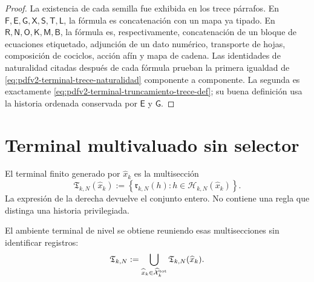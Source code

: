 \begin{proof}
La existencia de cada semilla fue exhibida en los trece párrafos. En
\(\mathsf F,\mathsf E,\mathsf G,\mathsf X,\mathsf S,\mathsf T,\mathsf L\),
la fórmula es concatenación con un mapa ya tipado. En
\(\mathsf R,\mathsf N,\mathsf O,\mathsf K,\mathsf M,\mathsf B\), la
fórmula es, respectivamente, concatenación de un bloque de ecuaciones
etiquetado, adjunción de un dato numérico, transporte de hojas, composición
de cociclos, acción afín y mapa de cadena. Las identidades de naturalidad
citadas después de cada fórmula prueban la primera igualdad de
\eqref{eq:pdfv2-terminal-trece-naturalidad} componente a componente. La
segunda es exactamente
\eqref{eq:pdfv2-terminal-truncamiento-trece-def}; su buena definición usa la
historia ordenada conservada por \(\mathsf E\) y \(\mathsf G\).
\end{proof}

\section{Terminal multivaluado sin selector}

El terminal finito generado por \(\widehat x_k\) es la multisecci\'on
\begin{equation}
\label{eq:pdfv2-terminal-multivaluado}
 \mathfrak T_{k,N}(\widehat x_k)
 :=\left\{\mathfrak r_{k,N}(h):
            h\in\mathscr H_{k,N}(\widehat x_k)\right\}.
\end{equation}
La expresi\'on de la derecha devuelve el conjunto entero. No contiene una
regla que distinga una historia privilegiada.

El ambiente terminal de nivel se obtiene reuniendo esas multisecciones sin
identificar registros:
\begin{equation}
\label{eq:pdfv2-terminal-ambiente-nivel}
 \mathfrak T_{k,N}
 :=\bigcup_{\widehat x_k\in\widehat{\mathcal X}^{\rm tot}_k}
   \mathfrak T_{k,N}(\widehat x_k).
\end{equation}

